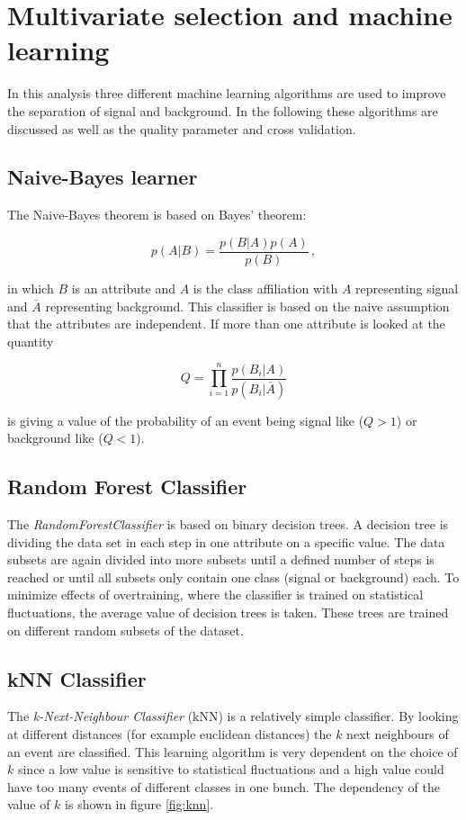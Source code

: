 \section{Multivariate selection and machine learning}
In this analysis three different machine learning algorithms are used to improve the separation of signal and background.
In the following these algorithms are discussed as well as the quality parameter and cross validation.

\subsection{Naive-Bayes learner}
The Naive-Bayes theorem is based on Bayes' theorem:

\begin{equation*}
    p\left(A|B \right) = \frac{p\left(B|A \right) p\left(A \right)}{p\left(B \right)} \, ,
\end{equation*}

in which $B$ is an attribute and $A$ is the class affiliation with $A$ representing signal and $\bar{A}$ representing background.
This classifier is based on the naive assumption that the attributes are independent.
If more than one attribute is looked at the quantity

\begin{equation*}
    Q = \prod\limits_{i = 1}^{n} \frac{p\left(B_i|A \right)}{p\left(B_i|\bar{A} \right)}
\end{equation*}

is giving a value of the probability of an event being signal like ($Q > 1$) or background like ($Q < 1$).

\subsection{Random Forest Classifier}
The \textit{RandomForestClassifier} is based on binary decision trees.
A decision tree is dividing the data set in each step in one attribute on a specific value.
The data subsets are again divided into more subsets until a defined number of steps is reached or until all subsets only contain one class (signal or background) each.
To minimize effects of overtraining, where the classifier is trained on statistical fluctuations, the average value of decision trees is taken.
These trees are trained on different random subsets of the dataset.

\subsection{kNN Classifier}
The \textit{k-Next-Neighbour Classifier} (kNN) is a relatively simple classifier.
By looking at different distances (for example euclidean distances) the $k$ next neighbours of an event are classified.
This learning algorithm is very dependent on the choice of $k$ since a low value is sensitive to statistical fluctuations and a high value could have too many events of different classes in one bunch.
The dependency of the value of $k$ is shown in figure \ref{fig:knn}.

